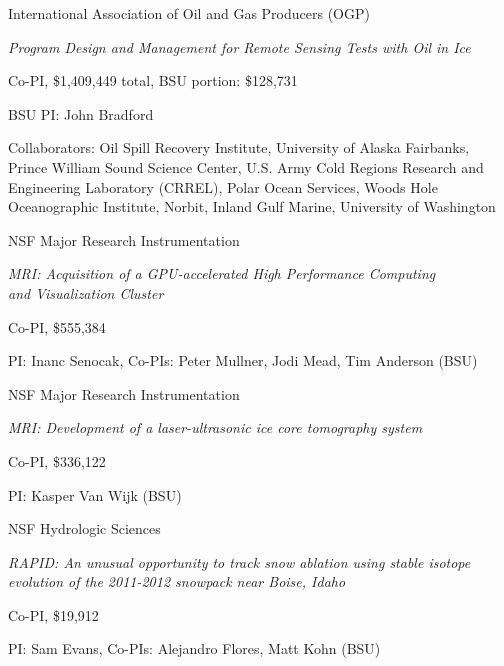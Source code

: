 \documentclass[11pt]{article}
\renewenvironment{itemize}{
  \begin{list}{}{
    \setlength{\leftmargin}{1.5em}
    \setlength{\itemsep}{0pt}
    \setlength{\parskip}{0pt}
  }
}{
  \end{list}
}
\begin{document}
\begin{itemize}
\item[01/2014-12/2014] International Association of Oil and Gas Producers (OGP)
\begin{itemize}
\item \textit{Program Design and Management for Remote Sensing Tests with Oil in Ice}
\item Co-PI, \$1,409,449 total, BSU portion: \$128,731
\item BSU PI: John Bradford
\item Collaborators: Oil Spill Recovery Institute, University of Alaska Fairbanks, Prince William Sound Science Center, U.S. Army Cold Regions Research and Engineering Laboratory (CRREL), Polar Ocean Services, Woods Hole Oceanographic Institute, Norbit, Inland Gulf Marine, University of Washington
\end{itemize}

\item[09/2012-08/2013] NSF Major Research Instrumentation
\begin{itemize}
\item \textit{MRI: Acquisition of a GPU-accelerated High Performance Computing} \\ 
\textit{and Visualization Cluster}
\item Co-PI, \$555,384
\item PI: Inanc Senocak, Co-PIs: Peter Mullner, Jodi Mead, Tim Anderson (BSU)
\end{itemize}

\item[09/2012-08/2013] NSF Major Research Instrumentation
\begin{itemize}
\item \textit{MRI: Development of a laser-ultrasonic ice core tomography system}
\item Co-PI, \$336,122
\item PI: Kasper Van Wijk (BSU)
\end{itemize}

\pagebreak

\item[04/2012-04/2013] NSF Hydrologic Sciences
\begin{itemize}
\item \textit{RAPID: An unusual opportunity to track snow ablation using stable isotope evolution of the 2011-2012 snowpack near Boise, Idaho}
\item Co-PI, \$19,912
\item PI: Sam Evans, Co-PIs: Alejandro Flores, Matt Kohn (BSU)
\end{itemize}


\end{itemize}
\end{document}
